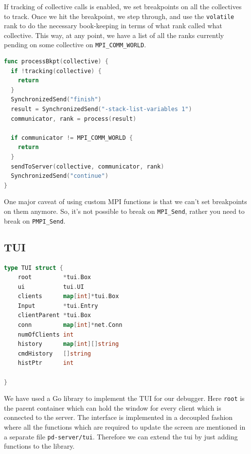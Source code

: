\documentclass[10pt,conference]{IEEEtran}
\begin{document}
If tracking of collective calls is enabled, we set breakpoints on all the collectives to track. Once we hit the breakpoint, we step through, and use the \texttt{volatile} rank to do the necessary book-keeping in terms of what rank called what collective. This way, at any point, we have a list of all the ranks currently pending on some collective on \texttt{MPI\_COMM\_WORLD}.

\begin{samepage}
  \begin{lstlisting}[language=Go, caption=Pseudocode for processing collectives inside Go]
func processBkpt(collective) {
  if !tracking(collective) {
    return
  }
  SynchronizedSend("finish")
  result = SynchronizedSend("-stack-list-variables 1")
  communicator, rank = process(result)

  if communicator != MPI_COMM_WORLD {
    return
  }
  sendToServer(collective, communicator, rank)
  SynchronizedSend("continue")
}
\end{lstlisting}
\end{samepage}


One major caveat of using custom MPI functions is that we can't set breakpoints on them anymore. So, it's not possible to break on \texttt{MPI\_Send}, rather you need to break on \texttt{PMPI\_Send}.

\subsection{TUI}
\begin{samepage}
  \begin{lstlisting}[language=Go, caption=Struct for the complete interface]
    type TUI struct {
	root         *tui.Box
	ui           tui.UI
	clients      map[int]*tui.Box
	Input        *tui.Entry
	clientParent *tui.Box
	conn         map[int]*net.Conn
	numOfClients int
	history      map[int][]string
	cmdHistory   []string
	histPtr      int

}
\end{lstlisting}
\end{samepage}

We have used a Go library \cite{gotui} to implement the TUI for our debugger.
Here \texttt{root} is the parent container which can hold the window for every
client which is connected to the server.
The interface is implemented in a decoupled fashion where all the functions
which are required to update the screen are mentioned in a separate file
\texttt{pd-server/tui}. Therefore we can extend the tui by just adding functions to the library.
\end{document}

